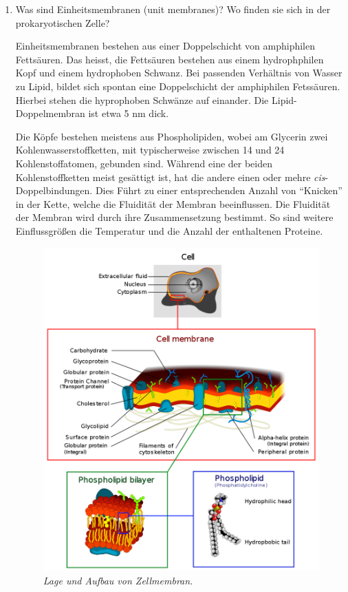\begin{enumerate}
		\item Was sind Einheitsmembranen (unit membranes)? Wo finden sie sich in der prokaryotischen Zelle?

			Einheitsmembranen bestehen aus einer Doppelschicht von amphiphilen Fettsäuren.
			Das heisst, die Fettsäuren bestehen aus einem hydrophphilen Kopf und einem hydrophoben Schwanz.
			Bei passenden Verhältnis von Wasser zu Lipid, bildet sich spontan eine Doppelschicht der amphiphilen Fetssäuren.
			Hierbei stehen die hyprophoben Schwänze auf einander.
			Die Lipid-Doppelmembran ist etwa 5 nm dick.
		
			Die Köpfe bestehen meistens aus Phospholipiden,
			wobei am Glycerin zwei Kohlenwasserstoffketten,
			mit typischerweise zwischen 14 und 24 Kohlenstoffatomen,
			gebunden sind.
			Während eine der beiden Kohlenstoffketten meist gesättigt ist,
			hat die andere einen oder mehre \textit{cis}-Doppelbindungen.
			Dies Führt zu einer entsprechenden Anzahl von ``Knicken'' in der Kette,
			welche die Fluidität der Membran beeinflussen.
			Die Fluidität der Membran wird durch ihre Zusammensetzung bestimmt.
			So sind weitere Einflussgrößen die Temperatur und
			die Anzahl der enthaltenen Proteine.

			\begin{figure}[ht!]
			\leavevmode
			\begin{center}
			\includegraphics[scale=0.36]{./pictures/cell_membrane_diag_1000}
			\end{center}
			\caption{\slshape{Lage und Aufbau von Zellmembran.}}
			\label{fig:cellmembrane}
			\end{figure}


\end{enumerate}
